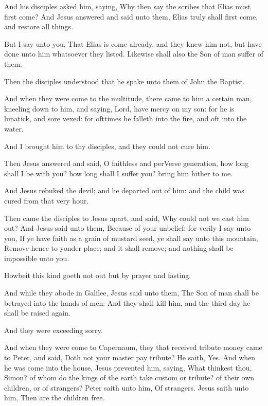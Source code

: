 \Verse And his disciples asked him, saying, Why then say the scribes that Elias must first come?  \Verse And Jesus answered and said unto them, Elias truly shall first come, and restore all things.

\Verse But I say unto you, That Elias is come already, and they knew him not, but have done unto him whatsoever they listed. Likewise shall also the Son of man suffer of them.

\Verse Then the disciples understood that he spake unto them of John the Baptist.

\Verse And when they were come to the multitude, there came to him a certain man, kneeling down to him, and saying, \Verse Lord, have mercy on my son: for he is lunatick, and sore vexed: for ofttimes he falleth into the fire, and oft into the water.

\Verse And I brought him to thy disciples, and they could not cure him.

\Verse Then Jesus answered and said, O faithless and perVerse generation, how long shall I be with you? how long shall I suffer you?  bring him hither to me.

\Verse And Jesus rebuked the devil; and he departed out of him: and the child was cured from that very hour.

\Verse Then came the disciples to Jesus apart, and said, Why could not we cast him out?  \Verse And Jesus said unto them, Because of your unbelief: for verily I say unto you, If ye have faith as a grain of mustard seed, ye shall say unto this mountain, Remove hence to yonder place; and it shall remove; and nothing shall be impossible unto you.

\Verse Howbeit this kind goeth not out but by prayer and fasting.

\Verse And while they abode in Galilee, Jesus said unto them, The Son of man shall be betrayed into the hands of men: \Verse And they shall kill him, and the third day he shall be raised again.

And they were exceeding sorry.

\Verse And when they were come to Capernaum, they that received tribute money came to Peter, and said, Doth not your master pay tribute?  \Verse He saith, Yes. And when he was come into the house, Jesus prevented him, saying, What thinkest thou, Simon? of whom do the kings of the earth take custom or tribute? of their own children, or of strangers?  \Verse Peter saith unto him, Of strangers. Jesus saith unto him, Then are the children free.

